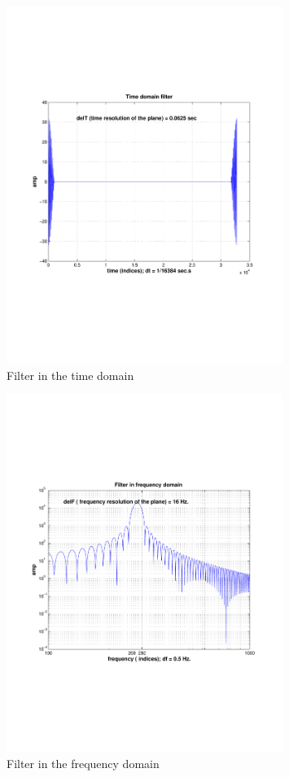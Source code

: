\begin{figure}
\begin{center}
\includegraphics[width=0.8\textwidth]{figures/timedomainfilter_1}
\caption{Filter in the time domain}
\label{fig:timedomainfilter_1}
\end{center}
\end{figure}
\begin{figure}
\begin{center}
\includegraphics[width=0.8\textwidth]{figures/freqdomainfilter_1}
\caption{Filter in the frequency domain}
\label{fig:freqdomainfilter_1}
\end{center}
\end{figure}

